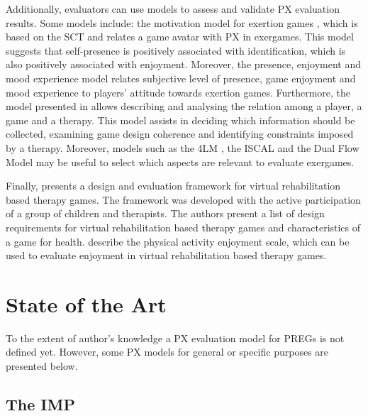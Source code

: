 Additionally, evaluators can use models to assess and validate \ac{PX} evaluation results. Some models include: the motivation model for exertion games \autocite{Li2016}, which is based on the \ac{SCT} and relates a game avatar with \ac{PX} in exergames. This model suggests that self-presence is positively associated with identification, which is also positively associated with enjoyment. Moreover, the presence, enjoyment and mood experience model \autocite{Ho2017} relates subjective level of presence, game enjoyment and mood experience to players' attitude towards exertion games. Furthermore, the model presented in \autocite{Mader2012} allows describing and analysing the relation among a player, a game and a therapy. This model assists in deciding which information should be collected, examining game design coherence and identifying constraints imposed by a therapy. Moreover, models such as the \ac{4LM} \autocite{Mueller2011}, the \ac{ISCAL} \autocite{Zhang2011} and the Dual Flow Model \autocite{Sinclair2007} may be useful to select which aspects are relevant to evaluate exergames.

Finally, \textcite{Ni2014} presents a design and evaluation framework for virtual rehabilitation based therapy games. The framework was developed with the active participation of a group of children and therapists. The authors present a list of design requirements for virtual rehabilitation based therapy games and characteristics of a game for health. \textcite{kendzierski1991physical} describe the physical activity enjoyment scale, which can be used to evaluate enjoyment in virtual rehabilitation based therapy games.


\section{State of the Art}
\label{sec:px_ux_models}

To the extent of author's knowledge a \ac{PX} evaluation model for \acp{PREG} is not defined yet. However, some \ac{PX} models for general or specific purposes are presented below.

\subsection{The \ac{IMP}} 

